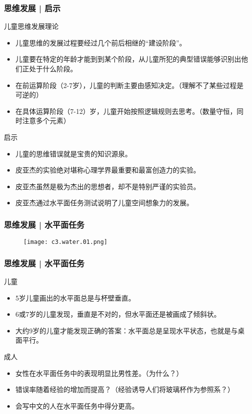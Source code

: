 \begin{frame}
  \frametitle{思维发展 | 启示}
  \begin{block}{儿童思维发展理论}
    \begin{itemize}
      \item 儿童思维的发展过程要经过几个前后相继的“建设阶段”。
      \item 儿童要在特定的年龄才能到到某个阶段，从儿童所犯的典型错误能够识别出他们正处于什么阶段。
      \item 在前运算阶段（2-7岁），儿童的判断主要由感知决定。（理解不了某些过程是可逆的）
      \item 在具体运算阶段（7-12）岁，儿童开始按照逻辑规则去思考。（数量守恒，同时注意多个元素）
    \end{itemize}
  \end{block}
  \pause
  \begin{block}{启示}
    \begin{itemize}
      \item 儿童的思维错误就是宝贵的知识源泉。
      \item 皮亚杰的实验绝对堪称心理学界最重要和最富创造力的实验。
      \item 皮亚杰虽然是极为杰出的思想者，却不是特别严谨的实验员。
      \item 皮亚杰通过水平面任务测试说明了儿童空间想象力的发展。
    \end{itemize}
  \end{block}
\end{frame}

\begin{frame}
  \frametitle{思维发展 | 水平面任务}
  \begin{figure}
    \centering
    \texttt{[image: c3.water.01.png]}
  \end{figure}
\end{frame}

\begin{frame}
  \frametitle{思维发展 | 水平面任务}
  \begin{block}{儿童}
    \begin{itemize}
      \item 5岁儿童画出的水平面总是与杯壁垂直。
      \item 6或7岁的儿童发现，垂直是不对的，但水平面还是被画成了倾斜状。
      \item 大约9岁的儿童才能发现正确的答案：水平面总是呈现水平状态，也就是与桌面平行。
    \end{itemize}
  \end{block}
  \pause
  \begin{block}{成人}
    \begin{itemize}
      \item 女性在水平面任务中的表现明显比男性差。（为什么？）
      \item 错误率随着经验的增加而提高？（经验诱导人们将玻璃杯作为参照系？）
      \item 会写中文的人在水平面任务中得分更高。
    \end{itemize}
  \end{block}
\end{frame}

